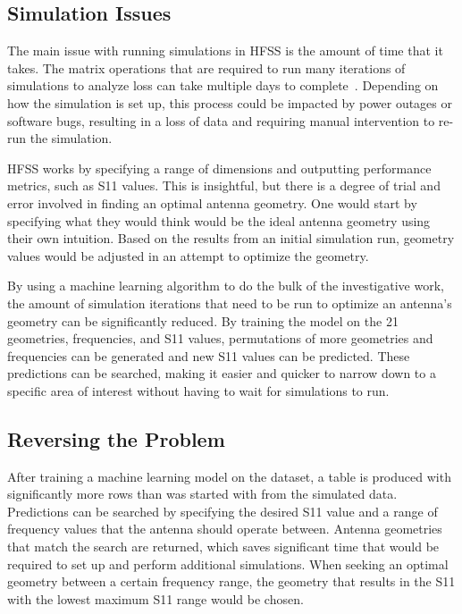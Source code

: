 \documentclass[lettersize,journal]{IEEEtran}
\begin{document}
\subsection{Simulation Issues}
The main issue with running simulations in HFSS is the amount of time that it takes. The matrix operations that are required to run many iterations of simulations to analyze loss can take multiple days to complete~\cite{john_antenna_2009}. Depending on how the simulation is set up, this process could be impacted by power outages or software bugs, resulting in a loss of data and requiring manual intervention to re-run the simulation. 

HFSS works by specifying a range of dimensions and outputting performance metrics, such as S11 values. This is insightful, but there is a degree of trial and error involved in finding an optimal antenna geometry. One would start by specifying what they would think would be the ideal antenna geometry using their own intuition. Based on the results from an initial simulation run, geometry values would be adjusted in an attempt to optimize the geometry.

By using a machine learning algorithm to do the bulk of the investigative work, the amount of simulation iterations that need to be run to optimize an antenna's geometry can be significantly reduced. By training the model on the 21 geometries, frequencies, and S11 values, permutations of more geometries and frequencies can be generated and new S11 values can be predicted. These predictions can be searched, making it easier and quicker to narrow down to a specific area of interest without having to wait for simulations to run.


\subsection{Reversing the Problem}
After training a machine learning model on the dataset, a table is produced with significantly more rows than was started with from the simulated data. Predictions can be searched by specifying the desired S11 value and a range of frequency values that the antenna should operate between. Antenna geometries that match the search are returned, which saves significant time that would be required to set up and perform additional simulations. When seeking an optimal geometry between a certain frequency range, the geometry that results in the S11 with the lowest maximum S11 range would be chosen.
\end{document}
